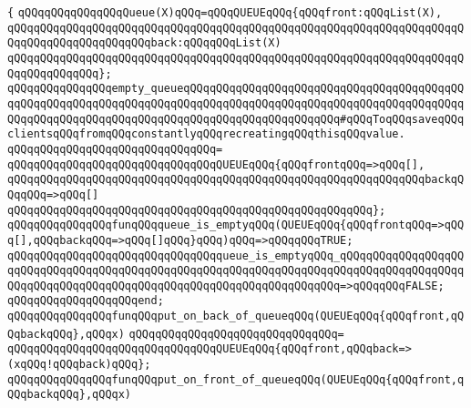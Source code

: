 \verb|{|\newline
\verb|qQQqqQQqqQQqqQQqQueue(X)qQQq=qQQqQUEUEqQQq{qQQqfront:qQQqList(X),|\newline
\verb|qQQqqQQqqQQqqQQqqQQqqQQqqQQqqQQqqQQqqQQqqQQqqQQqqQQqqQQqqQQqqQQqqQQqqQQqqQQqqQQqqQQqqQQqqQQqback:qQQqqQQqList(X)|\newline
\verb|qQQqqQQqqQQqqQQqqQQqqQQqqQQqqQQqqQQqqQQqqQQqqQQqqQQqqQQqqQQqqQQqqQQqqQQqqQQqqQQqqQQq};|\newline
\newline
\verb|qQQqqQQqqQQqqQQqempty_queueqQQqqQQqqQQqqQQqqQQqqQQqqQQqqQQqqQQqqQQqqQQqqQQqqQQqqQQqqQQqqQQqqQQqqQQqqQQqqQQqqQQqqQQqqQQqqQQqqQQqqQQqqQQqqQQqqQQqqQQqqQQqqQQqqQQqqQQqqQQqqQQqqQQqqQQqqQQqqQQqqQQq#qQQqToqQQqsaveqQQqclientsqQQqfromqQQqconstantlyqQQqrecreatingqQQqthisqQQqvalue.|\newline
\verb|qQQqqQQqqQQqqQQqqQQqqQQqqQQqqQQq=|\newline
\verb|qQQqqQQqqQQqqQQqqQQqqQQqqQQqqQQqQUEUEqQQq{qQQqfrontqQQq=>qQQq[],|\newline
\verb|qQQqqQQqqQQqqQQqqQQqqQQqqQQqqQQqqQQqqQQqqQQqqQQqqQQqqQQqqQQqqQQqbackqQQqqQQq=>qQQq[]|\newline
\verb|qQQqqQQqqQQqqQQqqQQqqQQqqQQqqQQqqQQqqQQqqQQqqQQqqQQqqQQq};|\newline
\newline
\newline
\verb|qQQqqQQqqQQqqQQqfunqQQqqueue_is_emptyqQQq(QUEUEqQQq{qQQqfrontqQQq=>qQQq[],qQQqbackqQQq=>qQQq[]qQQq}qQQq)qQQq=>qQQqqQQqTRUE;|\newline
\verb|qQQqqQQqqQQqqQQqqQQqqQQqqQQqqQQqqueue_is_emptyqQQq_qQQqqQQqqQQqqQQqqQQqqQQqqQQqqQQqqQQqqQQqqQQqqQQqqQQqqQQqqQQqqQQqqQQqqQQqqQQqqQQqqQQqqQQqqQQqqQQqqQQqqQQqqQQqqQQqqQQqqQQqqQQqqQQqqQQqqQQqqQQq=>qQQqqQQqFALSE;|\newline
\verb|qQQqqQQqqQQqqQQqqQQqend;|\newline
\newline
\newline
\verb|qQQqqQQqqQQqqQQqfunqQQqput_on_back_of_queueqQQq(QUEUEqQQq{qQQqfront,qQQqbackqQQq},qQQqx)|\newline
\verb|qQQqqQQqqQQqqQQqqQQqqQQqqQQqqQQq=|\newline
\verb|qQQqqQQqqQQqqQQqqQQqqQQqqQQqqQQqQUEUEqQQq{qQQqfront,qQQqback=>(xqQQq!qQQqback)qQQq};|\newline
\newline
\verb|qQQqqQQqqQQqqQQqfunqQQqput_on_front_of_queueqQQq(QUEUEqQQq{qQQqfront,qQQqbackqQQq},qQQqx)|\newline
